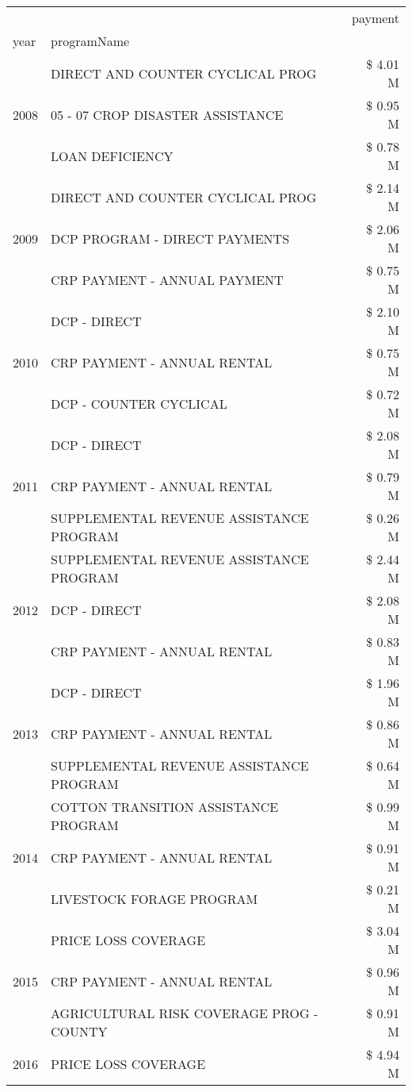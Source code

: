 \begin{tabular}{llr}
\toprule
 &  & payment \\
year & programName &  \\
\midrule
\multirow[t]{3}{*}{2008} & DIRECT AND COUNTER CYCLICAL PROG & \$ 4.01 M \\
 & 05 - 07 CROP DISASTER ASSISTANCE & \$ 0.95 M \\
 & LOAN DEFICIENCY & \$ 0.78 M \\
\cline{1-3}
\multirow[t]{3}{*}{2009} & DIRECT AND COUNTER CYCLICAL PROG & \$ 2.14 M \\
 & DCP PROGRAM - DIRECT PAYMENTS & \$ 2.06 M \\
 & CRP PAYMENT - ANNUAL PAYMENT & \$ 0.75 M \\
\cline{1-3}
\multirow[t]{3}{*}{2010} & DCP - DIRECT & \$ 2.10 M \\
 & CRP PAYMENT - ANNUAL RENTAL & \$ 0.75 M \\
 & DCP - COUNTER CYCLICAL & \$ 0.72 M \\
\cline{1-3}
\multirow[t]{3}{*}{2011} & DCP - DIRECT & \$ 2.08 M \\
 & CRP PAYMENT - ANNUAL RENTAL & \$ 0.79 M \\
 & SUPPLEMENTAL REVENUE ASSISTANCE PROGRAM & \$ 0.26 M \\
\cline{1-3}
\multirow[t]{3}{*}{2012} & SUPPLEMENTAL REVENUE ASSISTANCE PROGRAM & \$ 2.44 M \\
 & DCP - DIRECT & \$ 2.08 M \\
 & CRP PAYMENT - ANNUAL RENTAL & \$ 0.83 M \\
\cline{1-3}
\multirow[t]{3}{*}{2013} & DCP - DIRECT & \$ 1.96 M \\
 & CRP PAYMENT - ANNUAL RENTAL & \$ 0.86 M \\
 & SUPPLEMENTAL REVENUE ASSISTANCE PROGRAM & \$ 0.64 M \\
\cline{1-3}
\multirow[t]{3}{*}{2014} & COTTON TRANSITION ASSISTANCE PROGRAM & \$ 0.99 M \\
 & CRP PAYMENT - ANNUAL RENTAL & \$ 0.91 M \\
 & LIVESTOCK FORAGE PROGRAM & \$ 0.21 M \\
\cline{1-3}
\multirow[t]{3}{*}{2015} & PRICE LOSS COVERAGE & \$ 3.04 M \\
 & CRP PAYMENT - ANNUAL RENTAL & \$ 0.96 M \\
 & AGRICULTURAL RISK COVERAGE PROG - COUNTY & \$ 0.91 M \\
\cline{1-3}
\multirow[t]{3}{*}{2016} & PRICE LOSS COVERAGE & \$ 4.94 M \\

\end{tabular}
